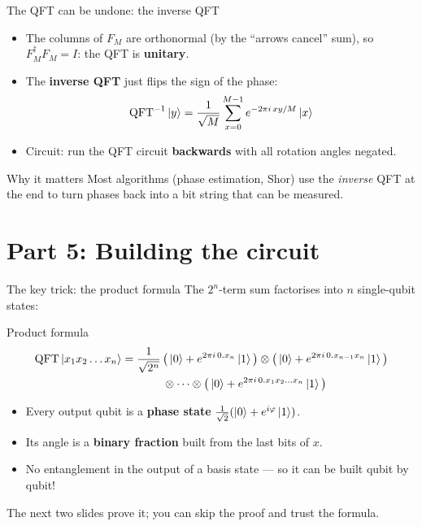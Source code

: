 \documentclass[aspectratio=169,11pt]{beamer}
\newcommand{\hl}[1]{{\color{qorange}\textbf{#1}}}
\newcommand{\key}[1]{{\color{qdark}\textbf{#1}}}
\begin{document}
\begin{frame}{The QFT can be undone: the inverse QFT}
  \begin{itemize}
    \item The columns of $F_M$ are orthonormal (by the ``arrows cancel'' sum), so $F_M^\dagger F_M = I$:
      the QFT is \key{unitary}.
    \item The \key{inverse QFT} just flips the sign of the phase:
      \[ \mathrm{QFT}^{-1}\ket{y} = \frac{1}{\sqrt M}\sum_{x=0}^{M-1} e^{-2\pi i\,xy/M}\ket{x} \]
    \item Circuit: run the QFT circuit \hl{backwards} with all rotation angles negated.
  \end{itemize}
  \begin{block}{Why it matters}
    Most algorithms (phase estimation, Shor) use the \emph{inverse} QFT at the end to turn phases back into a bit
    string that can be measured.
  \end{block}
\end{frame}

\section{Part 5: Building the circuit}
\begin{frame}{The key trick: the product formula}
  The $2^n$-term sum factorises into $n$ single-qubit states:
  \begin{block}{Product formula}
    \[ \begin{aligned}\mathrm{QFT}\ket{x_1x_2\dots x_n} = \frac{1}{\sqrt{2^n}}\,
       &\big(\ket0 + e^{2\pi i\,0.x_n}\ket1\big)\otimes
       \big(\ket0 + e^{2\pi i\,0.x_{n-1}x_n}\ket1\big)\\
       &\otimes\cdots\otimes
       \big(\ket0 + e^{2\pi i\,0.x_1x_2\dots x_n}\ket1\big)\end{aligned} \]
  \end{block}
  \begin{itemize}
    \item Every output qubit is a \key{phase state} $\tfrac{1}{\sqrt2}(\ket0 + e^{i\varphi}\ket1)$.
    \item Its angle is a \key{binary fraction} built from the last bits of $x$.
    \item No entanglement in the output of a basis state --- so it can be built qubit by qubit!
  \end{itemize}
  The next two slides prove it; you can skip the proof and trust the formula.
\end{frame}
\end{document}
